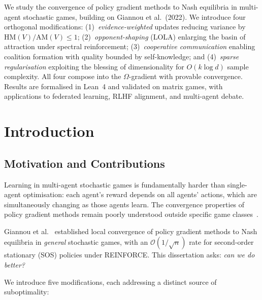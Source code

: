\documentclass[a4paper,oneside,11pt]{report}
\begin{document}
\dissertationtitlepage

\begin{dissertationsummary}
We study the convergence of policy gradient methods to Nash equilibria in multi-agent stochastic games, building on Giannou et al.\ (2022). We introduce four orthogonal modifications: (1)~\emph{evidence-weighted} updates reducing variance by $\mathrm{HM}(V)/\mathrm{AM}(V) \leq 1$; (2)~\emph{opponent-shaping} (LOLA) enlarging the basin of attraction under spectral reinforcement; (3)~\emph{cooperative communication} enabling coalition formation with quality bounded by self-knowledge; and (4)~\emph{sparse regularisation} exploiting the blessing of dimensionality for $O(k \log d)$ sample complexity. All four compose into the $\Omega$-gradient with provable convergence. Results are formalised in Lean~4 and validated on matrix games, with applications to federated learning, RLHF alignment, and multi-agent debate.
\end{dissertationsummary}

\dissertationtableofcontents

\chapter{Introduction}
\label{ch:introduction}

\section{Motivation and Contributions}

Learning in multi-agent stochastic games is fundamentally harder than single-agent optimisation: each agent's reward depends on all agents' actions, which are simultaneously changing as those agents learn. The convergence properties of policy gradient methods remain poorly understood outside specific game classes~\cite{giannou2022}.

Giannou et al.~\cite{giannou2022} established local convergence of policy gradient methods to Nash equilibria in \emph{general} stochastic games, with an $\mathcal{O}(1/\sqrt{n})$ rate for second-order stationary (SOS) policies under REINFORCE. This dissertation asks: \emph{can we do better?}

We introduce five modifications, each addressing a distinct source of suboptimality:
\end{document}
